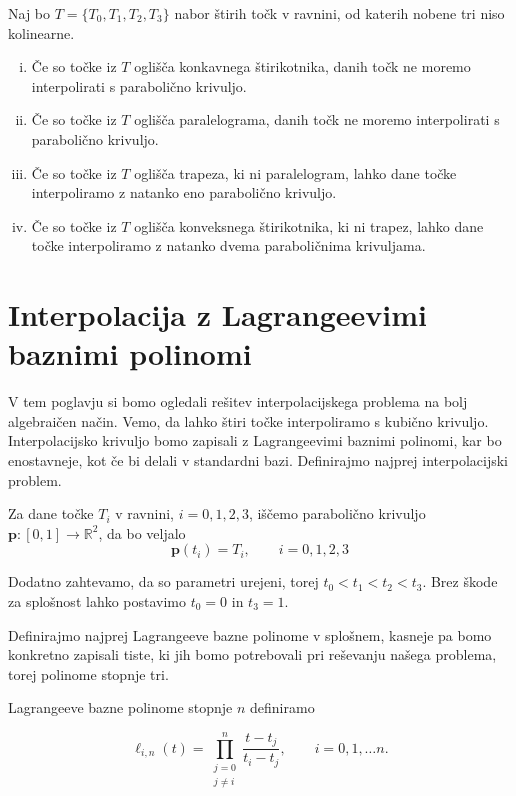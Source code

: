 \documentclass[mat1]{fmfdelo}
\newcommand{\R}{\mathbb R}
\begin{document}
\begin{izrek}
Naj bo $T = \{ T_0, T_1, T_2, T_3 \}$ nabor štirih točk v ravnini, od katerih nobene tri niso kolinearne.

\begin{enumerate}[i)]

\item Če so točke iz $T$ oglišča konkavnega štirikotnika, danih točk ne moremo interpolirati s parabolično krivuljo.

\item Če so točke iz $T$ oglišča paralelograma, danih točk ne moremo interpolirati s parabolično krivuljo.

\item Če so točke iz $T$ oglišča trapeza, ki ni paralelogram, lahko dane točke interpoliramo z natanko eno parabolično krivuljo.

\item Če so točke iz $T$ oglišča konveksnega štirikotnika, ki ni trapez, lahko dane točke interpoliramo z natanko dvema paraboličnima krivuljama.
\end{enumerate}

\end{izrek}

\section{Interpolacija z Lagrangeevimi baznimi polinomi}

V tem poglavju si bomo ogledali rešitev interpolacijskega problema na bolj algebraičen način. Vemo, da lahko štiri točke interpoliramo s kubično krivuljo. Interpolacijsko krivuljo bomo zapisali z Lagrangeevimi baznimi polinomi, kar bo enostavneje, kot če bi delali v standardni bazi. Definirajmo najprej interpolacijski problem.

Za dane točke $T_i$ v ravnini, $i = 0, 1, 2, 3$, iščemo parabolično krivuljo $\textbf{p} : [ 0, 1 ] \rightarrow \R^2$, da bo veljalo $$\textbf{p}(t_i) = T_i, \qquad i = 0, 1, 2, 3$$ 

Dodatno zahtevamo, da so parametri urejeni, torej $t_0 < t_1 < t_2 < t_3$. Brez škode za splošnost lahko postavimo $t_0 = 0$ in $t_3 = 1$.

Definirajmo najprej Lagrangeeve bazne polinome v splošnem, kasneje pa bomo konkretno zapisali tiste, ki jih bomo potrebovali pri reševanju našega problema, torej polinome stopnje tri.


\begin{definicija}
Lagrangeeve bazne polinome stopnje $n$ definiramo

$$ \ell_{i,n}(t) = \prod_{\substack{j=0 \\ j \neq i}}^{n} \frac{t - t_j}{t_i - t_j} , \qquad i = 0, 1, \ldots n.$$	
\end{definicija}
\end{document}
